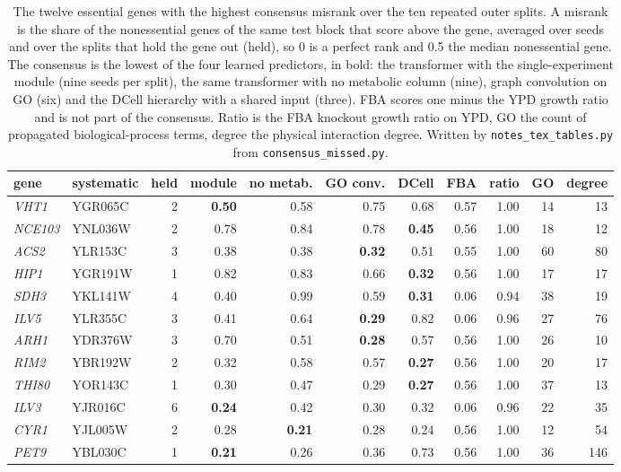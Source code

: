\begin{table}[H]
  \centering
  \footnotesize
  \caption[Essential genes every predictor ranks low]{The twelve essential genes with the highest consensus misrank over the ten repeated outer splits. A misrank is the share of the nonessential genes of the same test block that score above the gene, averaged over seeds and over the splits that hold the gene out (held), so 0 is a perfect rank and 0.5 the median nonessential gene. The consensus is the lowest of the four learned predictors, in bold: the transformer with the single-experiment module (nine seeds per split), the same transformer with no metabolic column (nine), graph convolution on GO (six) and the DCell hierarchy with a shared input (three). FBA scores one minus the YPD growth ratio and is not part of the consensus. Ratio is the FBA knockout growth ratio on YPD, GO the count of propagated biological-process terms, degree the physical interaction degree. Written by \texttt{notes\_tex\_tables.py} from \texttt{consensus\_missed.py}.}
  \label{tab:consensus-missed}
  \begin{tabular}{@{}llrrrrrrrrr@{}}
    \hline
    gene & systematic & held & module & no metab. & GO conv. & DCell & FBA & ratio & GO & degree \\
    \hline
    \textit{VHT1} & YGR065C & 2 & \textbf{0.50} & 0.58 & 0.75 & 0.68 & 0.57 & 1.00 & 14 & 13 \\
    \textit{NCE103} & YNL036W & 2 & 0.78 & 0.84 & 0.78 & \textbf{0.45} & 0.56 & 1.00 & 18 & 12 \\
    \textit{ACS2} & YLR153C & 3 & 0.38 & 0.38 & \textbf{0.32} & 0.51 & 0.55 & 1.00 & 60 & 80 \\
    \textit{HIP1} & YGR191W & 1 & 0.82 & 0.83 & 0.66 & \textbf{0.32} & 0.56 & 1.00 & 17 & 17 \\
    \textit{SDH3} & YKL141W & 4 & 0.40 & 0.99 & 0.59 & \textbf{0.31} & 0.06 & 0.94 & 38 & 19 \\
    \textit{ILV5} & YLR355C & 3 & 0.41 & 0.64 & \textbf{0.29} & 0.82 & 0.06 & 0.96 & 27 & 76 \\
    \textit{ARH1} & YDR376W & 3 & 0.70 & 0.51 & \textbf{0.28} & 0.57 & 0.56 & 1.00 & 26 & 10 \\
    \textit{RIM2} & YBR192W & 2 & 0.32 & 0.58 & 0.57 & \textbf{0.27} & 0.56 & 1.00 & 20 & 17 \\
    \textit{THI80} & YOR143C & 1 & 0.30 & 0.47 & 0.29 & \textbf{0.27} & 0.56 & 1.00 & 37 & 13 \\
    \textit{ILV3} & YJR016C & 6 & \textbf{0.24} & 0.42 & 0.30 & 0.32 & 0.06 & 0.96 & 22 & 35 \\
    \textit{CYR1} & YJL005W & 2 & 0.28 & \textbf{0.21} & 0.28 & 0.24 & 0.56 & 1.00 & 12 & 54 \\
    \textit{PET9} & YBL030C & 1 & \textbf{0.21} & 0.26 & 0.36 & 0.73 & 0.56 & 1.00 & 36 & 146 \\
    \hline
  \end{tabular}
\end{table}
